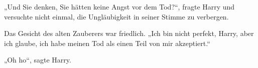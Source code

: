 „Und Sie denken, Sie hätten keine Angst vor dem Tod?“, fragte Harry und versuchte nicht einmal, die Ungläubigkeit in seiner Stimme zu verbergen.

Das Gesicht des alten Zauberers war friedlich.
„Ich bin nicht perfekt, Harry, aber ich glaube, ich habe meinen Tod als einen Teil von mir akzeptiert.“

„Oh ho“, sagte Harry.
